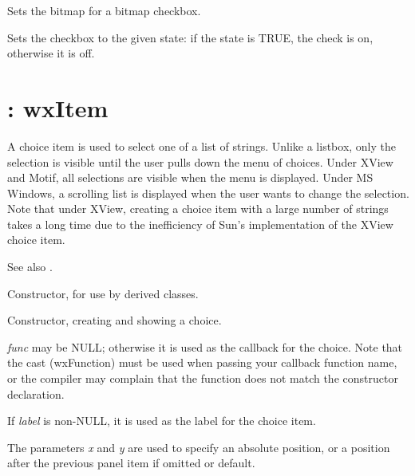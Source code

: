Sets the bitmap for a bitmap checkbox.



Sets the checkbox to the given state: if the state is TRUE, the check is on,
otherwise it is off.


\section{: wxItem}\label{wxchoice}

A choice item is used to select one of a list of strings. Unlike a
listbox, only the selection is visible until the user pulls down the
menu of choices. Under XView and Motif, all selections are visible
when the menu is displayed. Under MS Windows, a scrolling list is
displayed when the user wants to change the selection. Note that under
XView, creating a choice item with a large number of strings takes a
long time due to the inefficiency of Sun's implementation of the XView
choice item.

See also .

\label{constrchoice}


Constructor, for use by derived classes.


Constructor, creating and showing a choice. 

{\it func} may be NULL; otherwise it is used as the callback for the
choice.  Note that the cast (wxFunction) must be used when passing your
callback function name, or the compiler may complain that the function
does not match the constructor declaration.

If {\it label} is non-NULL, it is used as the label for the choice item.

The parameters {\it x} and {\it y} are used to specify an absolute
position, or a position after the previous panel item if omitted or
default.

